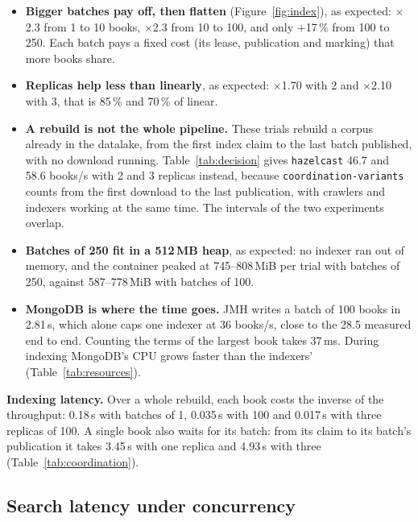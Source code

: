 \documentclass[11pt,a4paper]{article}
\newcommand{\code}[1]{\nolinkurl{#1}}
\newcommand{\mode}[1]{\code{#1}}
\begin{document}
\begin{itemize}
\item \textbf{Bigger batches pay off, then flatten} (Figure~\ref{fig:index}), as expected: $\times$2.3 from 1 to 10
  books, $\times$2.3 from 10 to 100, and only +17\,\% from 100 to 250. Each batch pays a fixed cost (its lease,
  publication and marking) that more books share.
\item \textbf{Replicas help less than linearly}, as expected: $\times$1.70 with 2 and $\times$2.10 with 3, that is 85\,\%
  and 70\,\% of linear.
\item \textbf{A rebuild is not the whole pipeline.} These trials rebuild a corpus already in the datalake, from the
  first index claim to the last batch published, with no download running. Table~\ref{tab:decision} gives
  \mode{hazelcast} 46.7 and 58.6 books/s with 2 and 3 replicas instead, because \code{coordination-variants} counts
  from the first download to the last publication, with crawlers and indexers working at the same time. The intervals
  of the two experiments overlap.
\item \textbf{Batches of 250 fit in a 512\,MB heap}, as expected: no indexer ran out of memory, and the container
  peaked at 745--808\,MiB per trial with batches of 250, against 587--778\,MiB with batches of 100.
\item \textbf{MongoDB is where the time goes.} JMH writes a batch of 100 books in 2.81\,s, which alone caps one
  indexer at 36 books/s, close to the 28.5 measured end to end. Counting the terms of the largest book takes 37\,ms.
  During indexing MongoDB's CPU grows faster than the indexers' (Table~\ref{tab:resources}).
\end{itemize}

\textbf{Indexing latency.} Over a whole rebuild, each book costs the inverse of the throughput: 0.18\,s with batches of
1, 0.035\,s with 100 and 0.017\,s with three replicas of 100. A single book also waits for its batch: from its claim
to its batch's publication it takes 3.45\,s with one replica and 4.93\,s with three (Table~\ref{tab:coordination}).

\subsection{Search latency under concurrency}
\label{sec:search}
\end{document}
